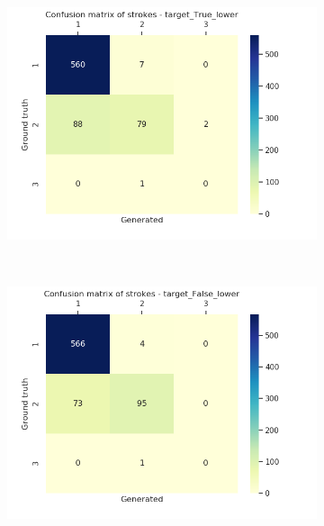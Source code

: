 \begin{figure}[!htbp]
        ~
        \begin{subfigure}[tb]{0.45\textwidth}
            \includegraphics[width=\textwidth]{images/sota/ironoff_results/True_lower_strokes_heatmap.png}
        \end{subfigure}
        ~
        \begin{subfigure}[tb]{0.45\textwidth}
            \includegraphics[width=\textwidth]{images/sota/ironoff_results/False_lower_strokes_heatmap.png}
        \end{subfigure}


\end{figure}
